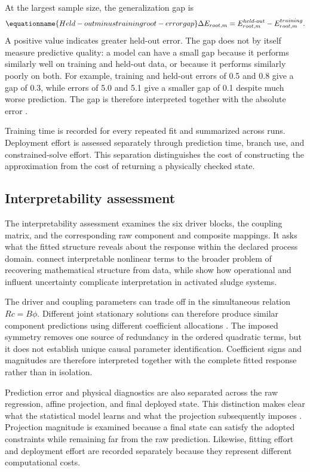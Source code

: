 At the largest sample size, the generalization gap is
\begin{equation}
\equationname{Held-out minus training root-error gap}
\label{eq:icsor_generalization_gap}
\Delta E_{root,m}=E_{root,m}^{held\text{-}out}-E_{root,m}^{training}.
\end{equation}
A positive value indicates greater held-out error. The gap does not by itself measure predictive quality: a model can have a small gap because it performs similarly well on training and held-out data, or because it performs similarly poorly on both. For example, training and held-out errors of 0.5 and 0.8 give a gap of 0.3, while errors of 5.0 and 5.1 give a smaller gap of 0.1 despite much worse prediction. The gap is therefore interpreted together with the absolute error \citep{Hastie2009}.

Training time is recorded for every repeated fit and summarized across runs. Deployment effort is assessed separately through prediction time, branch use, and constrained-solve effort. This separation distinguishes the cost of constructing the approximation from the cost of returning a physically checked state.

\subsection{Interpretability assessment}

The interpretability assessment examines the six driver blocks, the coupling matrix, and the corresponding raw component and composite mappings. It asks what the fitted structure reveals about the response within the declared process domain. \citet{Brunton2016} connect interpretable nonlinear terms to the broader problem of recovering mathematical structure from data, while \citet{Machado2014} show how operational and influent uncertainty complicate interpretation in activated sludge systems.

The driver and coupling parameters can trade off in the simultaneous relation \(Rc=B\phi\). Different joint stationary solutions can therefore produce similar component predictions using different coefficient allocations \citep{Selerio2026}. The imposed symmetry removes one source of redundancy in the ordered quadratic terms, but it does not establish unique causal parameter identification. Coefficient signs and magnitudes are therefore interpreted together with the complete fitted response rather than in isolation.

Prediction error and physical diagnostics are also separated across the raw regression, affine projection, and final deployed state. This distinction makes clear what the statistical model learns and what the projection subsequently imposes \citep{Karniadakis2021,KircherVotsmeier2025}. Projection magnitude is examined because a final state can satisfy the adopted constraints while remaining far from the raw prediction. Likewise, fitting effort and deployment effort are recorded separately because they represent different computational costs.

